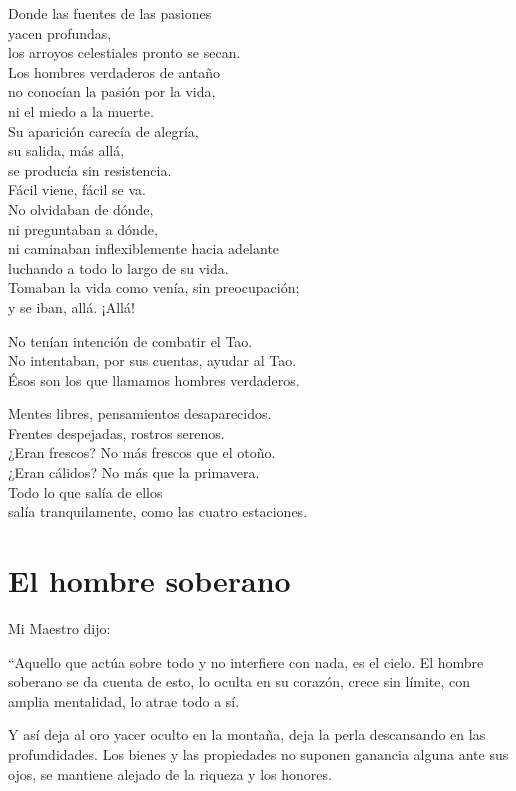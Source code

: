 \documentclass[book,b5paper,hidelinks,final]{memoir}
\begin{document}
	Donde las fuentes de las pasiones\\
	yacen profundas,\\
	los arroyos celestiales pronto se secan.\\
	Los hombres verdaderos de antaño\\
	no conocían la pasión por la vida,\\
	ni el miedo a la muerte.\\
	Su aparición carecía de alegría,\\
	su salida, más allá,\\
	se producía sin resistencia.\\
	Fácil viene, fácil se va.\\
	No olvidaban de dónde,\\
	ni preguntaban a dónde,\\
	ni caminaban inflexiblemente hacia adelante\\
	luchando a todo lo largo de su vida.\\
	Tomaban la vida como venía, sin preocupación;\\
	y se iban, allá. ¡Allá!
	
	No tenían intención de combatir el Tao.\\
	No intentaban, por sus cuentas, ayudar al Tao.\\
	Ésos son los que llamamos hombres verdaderos.
	
	Mentes libres, pensamientos desaparecidos.\\
	Frentes despejadas, rostros serenos.\\
	¿Eran frescos? No más frescos que el otoño.\\
	¿Eran cálidos? No más que la primavera.\\
	Todo lo que salía de ellos\\
	salía tranquilamente, como las cuatro estaciones.
	
	\chapter*{El hombre soberano}
	
	Mi Maestro dijo:
	
	``Aquello que actúa sobre todo y no interfiere con nada, es el cielo. El
	hombre soberano se da cuenta de esto, lo oculta en su corazón, crece sin
	límite, con amplia mentalidad, lo atrae todo a sí.
	
	Y así deja al oro yacer oculto en la montaña, deja la perla descansando
	en las profundidades. Los bienes y las propiedades no suponen ganancia
	alguna ante sus ojos, se mantiene alejado de la riqueza y los honores.
	
\end{document}
